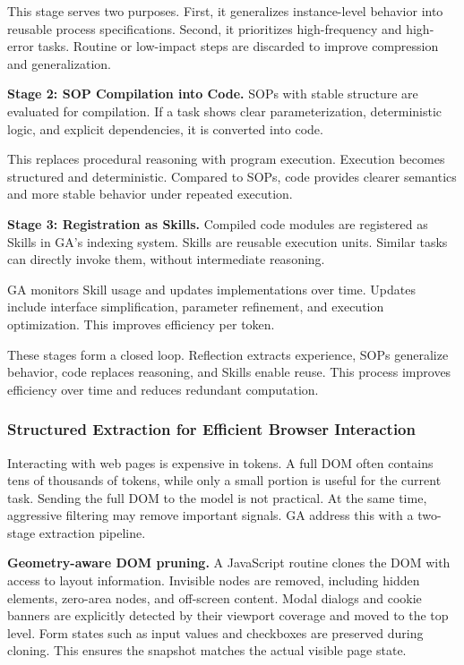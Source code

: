This stage serves two purposes. First, it generalizes instance-level behavior into reusable process specifications. Second, it prioritizes high-frequency and high-error tasks. Routine or low-impact steps are discarded to improve compression and generalization.

\textbf{Stage 2: SOP Compilation into Code.} SOPs with stable structure are evaluated for compilation. If a task shows clear parameterization, deterministic logic, and explicit dependencies, it is converted into code.

This replaces procedural reasoning with program execution. Execution becomes structured and deterministic. Compared to SOPs, code provides clearer semantics and more stable behavior under repeated execution.

\textbf{Stage 3: Registration as Skills.} Compiled code modules are registered as Skills in GA’s indexing system. Skills are reusable execution units. Similar tasks can directly invoke them, without intermediate reasoning.

GA monitors Skill usage and updates implementations over time. Updates include interface simplification, parameter refinement, and execution optimization. This improves efficiency per token.

These stages form a closed loop. Reflection extracts experience, SOPs generalize behavior, code replaces reasoning, and Skills enable reuse. This process improves efficiency over time and reduces redundant computation. 

\subsubsection{Structured Extraction for Efficient Browser Interaction}
Interacting with web pages is expensive in tokens. A full DOM often contains tens of thousands of tokens, while only a small portion is useful for the current task. Sending the full DOM to the model is not practical. At the same time, aggressive filtering may remove important signals. GA address this with a two-stage extraction pipeline.

\textbf{Geometry-aware DOM pruning.} A JavaScript routine clones the DOM with access to layout information. Invisible nodes are removed, including hidden elements, zero-area nodes, and off-screen content. Modal dialogs and cookie banners are explicitly detected by their viewport coverage and moved to the top level. Form states such as input values and checkboxes are preserved during cloning. This ensures the snapshot matches the actual visible page state.

